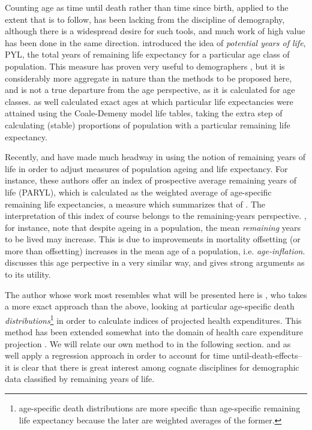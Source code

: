Counting age as time until death rather than time
since birth, applied to the extent that is to
follow, has been lacking from the discipline of demography, although there is a
widespread desire for such tools, and much work of high value has been done in
the same direction. \citet{hersch1944demographie}
introduced the idea of \textit{potential years of life}, PYL, the
total years of remaining life expectancy for a particular age class of
population. This measure has proven very useful to demographers
\citep{panush1996potential}, but it is considerably more aggregate in 
nature than the methods to be proposed
here, and is not a true departure from the age perspective, as it is calculated
for age classes. \citet{ryder1975notes} as well calculated exact ages at which
particular life expectancies were attained using the Coale-Demeny model
life tables, taking the extra step of calculating (stable) proportions
of population with a particular remaining life expectancy.

Recently, 
\citet{sanderson2005average, sanderson2010remeasuring} and have made much
headway in using the notion of remaining years of life in
 order to adjust measures of population ageing and life expectancy. For instance, 
 these authors offer an index of prospective average remaining years of life
 (PARYL), which is calculated as the weighted average of age-specific 
 remaining life expectancies, a measure which summarizes that of
 \citet{hersch1944demographie}. The interpretation of this index of
 course belongs to the remaining-years perspective.
 \citet{sanderson2005average}, for instance, note that despite ageing 
 in a population, the mean \textit{remaining} years to 
 be lived may increase. This is due to improvements in mortality offsetting 
 (or more than offsetting) increases in the mean age of a population, i.e.
 \textit{age-inflation}\citep{shoven2010adjusting}. \citet{sanderson2007new}
 discusses this age perpective in a very similar way, and gives strong arguments
 as to its utility.

The author whose work most resembles what will be
presented here is \citet{miller2001increasing}, who takes a more
exact approach than the above, looking at particular age-specific death
\textit{distributions}\footnote{age-specific death distributions are more
 specific than age-specific remaining life expectancy because the later are weighted 
 averages of the former.} in order to calculate indices
 of projected health expenditures. This method has been extended somewhat into
 the domain of health care expenditure projection
 \citep{lee2002approach,lee2007demographic,topoleski2004uncertainty}. We will
 relate our own method to \citet{miller2001increasing} in the
 following section. \citet{stearns2004time} and \citet{seshamani2004longitudinal} as well apply a regression approach in
 order to account for time until-death-effects-- it is clear that there is great
 interest among cognate disciplines for demographic data classified by remaining
 years of life.
 
